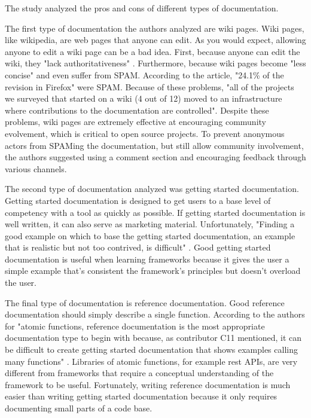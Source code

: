 \documentclass[titlepage]{article}
\begin{document}
The study analyzed the pros and cons of different types of documentation. 

The first type of documentation the authors analyzed are wiki pages. Wiki pages, like wikipedia, are web pages that anyone can edit. As you would expect, allowing anyone to edit a wiki page can be a bad idea. First, because anyone can edit the wiki, they "lack authoritativeness" \cite[p.5]{Dagenais:2010:CED:1882291.1882312}. Furthermore, because wiki pages become "less concise" \cite[p.5]{Dagenais:2010:CED:1882291.1882312} and even suffer from SPAM. According to the article, "24.1\% of the revision in Firefox"\cite[p.5]{Dagenais:2010:CED:1882291.1882312} were SPAM. Because of these problems, "all of the projects we surveyed that started on a wiki (4 out of 12) moved to an infrastructure where contributions to the documentation are controlled"\cite[p.5]{Dagenais:2010:CED:1882291.1882312}. Despite these problems, wiki pages are extremely effective at encouraging community evolvement, which is critical to open source projects. To prevent anonymous actors from SPAMing the documentation, but still allow community involvement, the authors suggested using a comment section and encouraging feedback through various channels.

The second type of documentation analyzed was getting started documentation. Getting started documentation is designed to get users to a base level of competency with a tool as quickly as possible. If getting started documentation is well written, it can also serve as marketing material. Unfortunately, "Finding a good example on which to base the getting started documentation, an example that is realistic but not too contrived, is difficult" \cite[p.6 Contributor 11]{Dagenais:2010:CED:1882291.1882312}. Good getting started documentation is useful when learning frameworks because it gives the user a simple example that's consistent the framework's principles but doesn't overload the user.

The final type of documentation is reference documentation. Good reference documentation should simply describe a single function. According to the authors for "atomic functions, reference documentation is the most appropriate documentation type to begin with because, as contributor C11 mentioned, it can be difficult to create getting started documentation that shows examples calling many functions" \cite[p.6]{Dagenais:2010:CED:1882291.1882312}. Libraries of atomic functions, for example rest APIs, are very different from frameworks that require a conceptual understanding of the framework to be useful. Fortunately, writing reference documentation is much easier than writing getting started documentation because it only requires documenting small parts of a code base. 
\end{document}
